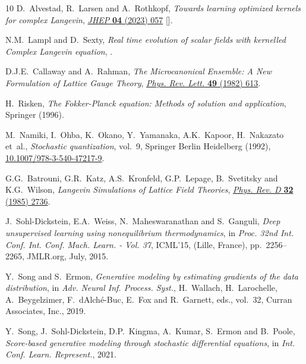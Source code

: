 \begin{thebibliography}{10}
D.~Alvestad, R.~Larsen and A.~Rothkopf, \emph{{Towards learning optimized
  kernels for complex Langevin}},
  \href{https://doi.org/10.1007/JHEP04(2023)057}{\emph{JHEP} {\bfseries 04}
  (2023) 057} [\href{https://arxiv.org/abs/2211.15625}{{}}].

N.M.~Lampl and D.~Sexty, \emph{{Real time evolution of scalar fields with
  kernelled Complex Langevin equation}},
  \href{https://arxiv.org/abs/2309.06103}{{}}.

D.J.E.~Callaway and A.~Rahman, \emph{{The Microcanonical Ensemble: A New
  Formulation of Lattice Gauge Theory}},
  \href{https://doi.org/10.1103/PhysRevLett.49.613}{\emph{Phys. Rev. Lett.}
  {\bfseries 49} (1982) 613}.

H.~Risken, \emph{The Fokker-Planck equation: Methods of solution and
  application}, Springer (1996).

M.~Namiki, I.~Ohba, K.~Okano, Y.~Yamanaka, A.K.~Kapoor, H.~Nakazato et~al.,
  \emph{{Stochastic quantization}}, vol.~9, Springer Berlin Heidelberg (1992),
  \href{https://doi.org/10.1007/978-3-540-47217-9}{10.1007/978-3-540-47217-9}.

G.G.~Batrouni, G.R.~Katz, A.S.~Kronfeld, G.P.~Lepage, B.~Svetitsky and
  K.G.~Wilson, \emph{{Langevin Simulations of Lattice Field Theories}},
  \href{https://doi.org/10.1103/PhysRevD.32.2736}{\emph{Phys. Rev. D}
  {\bfseries 32} (1985) 2736}.

J.~{Sohl-Dickstein}, E.A.~Weiss, N.~Maheswaranathan and S.~Ganguli, \emph{Deep
  unsupervised learning using nonequilibrium thermodynamics},  in \emph{Proc.
  32nd {{Int}}. {{Conf}}. {{Int}}. {{Conf}}. {{Mach}}. {{Learn}}. - {{Vol}}.
  37}, {{ICML}}'15, ({Lille, France}), pp.~2256--2265, {JMLR.org}, July, 2015.

Y.~Song and S.~Ermon, \emph{Generative modeling by estimating gradients of the
  data distribution},  in \emph{Adv. {{Neural Inf}}. {{Process}}. {{Syst}}.},
  H.~Wallach, H.~Larochelle, A.~Beygelzimer, F.~{dAlch{\'e}-Buc}, E.~Fox and
  R.~Garnett, eds., vol.~32, {Curran Associates, Inc.}, 2019.

Y.~Song, J.~{Sohl-Dickstein}, D.P.~Kingma, A.~Kumar, S.~Ermon and B.~Poole,
  \emph{Score-based generative modeling through stochastic differential
  equations},  in \emph{Int. {{Conf}}. {{Learn}}. {{Represent}}.}, 2021.


\end{thebibliography}
